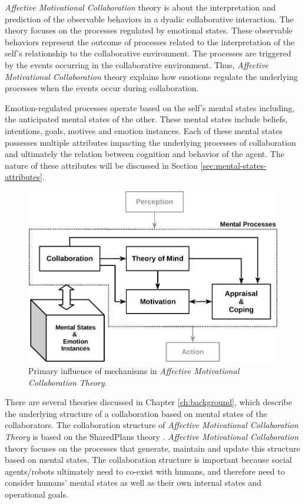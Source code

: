 \documentclass[12pt]{report}
\begin{document}
\textit{Affective Motivational Collaboration} theory is about the interpretation
and prediction of the observable behaviors in a dyadic collaborative
interaction. The theory focuses on the processes regulated by emotional states.
These observable behaviors represent the outcome of processes related to the
interpretation of the self's relationship to the collaborative environment.
The processes are triggered by the events occurring in the collaborative
environment. Thus, \textit{Affective Motivational Collaboration} theory explains
how emotions regulate the underlying processes when the events occur during
collaboration.

Emotion-regulated processes operate based on the self's mental states including,
the anticipated mental states of the other. These mental states include beliefs,
intentions, goals, motives and emotion instances. Each of these mental states
possesses multiple attributes impacting the underlying processes of
collaboration and ultimately the relation between cognition and behavior of the
agent. The nature of these attributes will be discussed in Section
\ref{sec:mental-states-attributes}.

\begin{figure}[h!] 
  \centering
  \includegraphics[scale=1]{figure/theory-general-croped.pdf}
  \caption{Primary influence of mechanisms in \textit{Affective Motivational
  Collaboration Theory}.}
  \label{fig:theory}
  \vspace*{-2mm}
\end{figure}

There are several theories discussed in Chapter \ref{ch:background}, which
describe the underlying structure of a collaboration based on mental states of
the collaborators. The collaboration structure of \textit{Affective Motivational
Collaboration Theory} is based on the SharedPlans theory
\cite{grosz:shared-plans}. \textit{Affective Motivational Collaboration} theory
focuses on the processes that generate, maintain and update this structure
based on mental states. The collaboration structure is important because social
agents/robots ultimately need to co-exist with humans, and therefore need to
consider humans' mental states as well as their own internal states and
operational goals.
\end{document}
